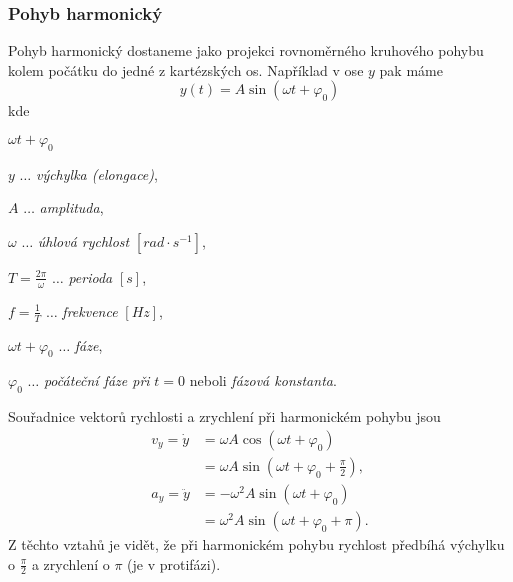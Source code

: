 {      \subsubsection{Pohyb harmonický}
        Pohyb harmonický dostaneme jako projekci rovnoměrného kruhového pohybu kolem počátku do
        jedné z kartézských os. Například v ose $y$ pak máme
        \begin{equation}\label{mech:eq_p_harmon}
          y(t)=A\sin(\omega t+\varphi_0)
        \end{equation}
        kde 
        \begin{labeling}{$\omega t+\varphi_0$}
          \setlength{\itemindent}{2cm}
          \item[\(y\)]                     \(\ldots\) \emph{výchylka (elongace)}, 
          \item[\(A\)]                     \(\ldots\) \emph{amplituda}, 
          \item[\(\omega\)]                \(\ldots\) \emph{úhlová rychlost} $[rad\cdot s^{-1}]$,
          \item[\(T=\frac{2\pi}{\omega}\)] \(\ldots\) \emph{perioda} $[s]$, 
          \item[\(f=\frac{1}{T}\)]         \(\ldots\) \emph{frekvence} $[Hz]$, 
          \item[\(\omega t+\varphi_0\)]    \(\ldots\) \emph{fáze}, 
          \item[\(\varphi_0\)]             \(\ldots\) \emph{počáteční fáze při} $t=0$ neboli
                                                      \emph{fázová konstanta}.
        \end{labeling}
  
        Souřadnice vektorů rychlosti a zrychlení při harmonickém pohybu jsou
        \begin{subequations}
          \label{mech:eq_harm} 
          \begin{align}
            v_y = \dot{y} 
              & = \omega A\cos(\omega t+\varphi_0 )               \nonumber \\
              & = \omega A\sin(\omega t+\varphi_0+\frac{\pi}{2}), \label{mech:eq_harm_vy}         \\
            a_y = \ddot{y} 
              &= -\omega^2A\sin(\omega t+\varphi_0 )              \nonumber \\
              &=  \omega^2A\sin(\omega t+\varphi_0+\pi).          \label{mech:eq_harm_ay}
          \end{align}
        \end{subequations}  
        Z těchto vztahů je vidět, že při harmonickém pohybu rychlost předbíhá výchylku o
        $\frac{\pi}{2}$ a zrychlení o $\pi$ (je v protifázi).

}

